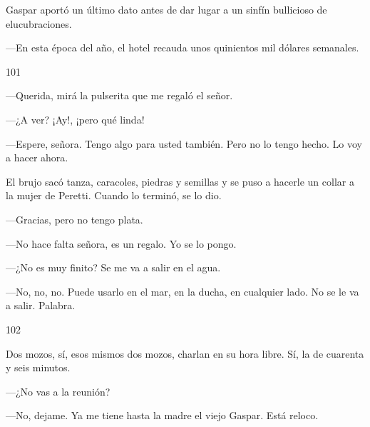 \documentclass[12pt,twoside,openright,a5paper]{book}
\begin{document}
Gaspar aportó un último dato antes de dar lugar a un sinfín bullicioso
de elucubraciones. 

---En esta época del año, el hotel recauda unos quinientos mil dólares semanales.

\vspace{0.5cm}

\hrulefill \hspace{0.1cm}\decofourleft\hspace{0.2cm} 101 \hspace{0.2cm}\decofourright \hspace{0.1cm}\hrulefill

\nopagebreak

\vspace{0.5cm}

\nopagebreak

---Querida, mirá la pulserita que me regaló el señor.

---¿A ver? ¡Ay!, ¡pero qué linda!

---Espere, señora. Tengo algo para usted también. Pero no lo tengo hecho. Lo
voy a hacer ahora.

El brujo sacó tanza, caracoles, piedras y semillas y se puso a hacerle
un collar a la mujer de Peretti. Cuando lo terminó, se lo dio.

---Gracias, pero no tengo plata.

---No hace falta señora, es un regalo. Yo se lo pongo.

---¿No es muy finito? Se me va a salir en el agua.

---No, no, no. Puede usarlo en el mar, en la ducha, en cualquier lado. No se
le va a salir. Palabra.

\vspace{0.5cm}

\hrulefill \hspace{0.1cm}\decofourleft\hspace{0.2cm} 102 \hspace{0.2cm}\decofourright \hspace{0.1cm}\hrulefill

\nopagebreak

\vspace{0.5cm}

\nopagebreak

Dos mozos, sí, esos mismos dos mozos, charlan en su hora libre. Sí, la de
cuarenta y seis minutos.

---¿No vas a la reunión?

---No, dejame. Ya me tiene hasta la madre el viejo Gaspar. Está reloco.
\end{document}

